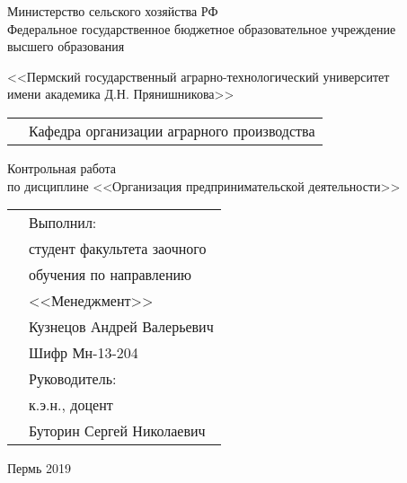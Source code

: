 \thispagestyle{empty}
\begin{center}
	Министерство сельского хозяйства РФ \\Федеральное государственное бюджетное образовательное учреждение\\ высшего образования
	\vspace{0.5ex}
	
	<<Пермский государственный аграрно-технологический университет\\ имени академика Д.Н. Прянишникова>>
\end{center}
\vspace{10ex}
\begin{tabularx}{\textwidth}{XX}
	& Кафедра организации аграрного производства \\
\end{tabularx}
\begin{center}
	\vspace{13ex}
	Контрольная работа\\
	по дисциплине <<Организация предпринимательской деятельности>> \\
	
\end{center}
	\vspace{8ex}
	\begin{tabularx}{\textwidth}{XX}
	& Выполнил:\\
	& студент факультета заочного \\
	& обучения по направлению \\
	& <<Менеджмент>> \\
	& Кузнецов Андрей Валерьевич \\
	& Шифр Мн-13-204\\
	& Руководитель:\\
	& к.э.н., доцент\\
	& Буторин Сергей Николаевич\\
	\end{tabularx}
\begin{center}
	\vfill
	Пермь 2019
\end{center}
